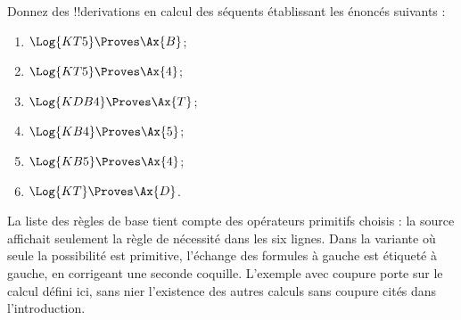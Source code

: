 \documentclass[../../../include/open-logic-section]{subfiles}
\begin{document}
\begin{prob}
Donnez des !!{derivation}s en calcul des séquents établissant les
énoncés suivants :
  \begin{enumerate}
  \item $\Log{KT5} \Proves \Ax{B}$;
  \item $\Log{KT5} \Proves \Ax{4}$;
  \item $\Log{KDB4} \Proves \Ax{T}$;
  \item $\Log{KB4} \Proves \Ax{5}$;
  \item $\Log{KB5} \Proves \Ax{4}$;
  \item $\Log{KT} \Proves \Ax{D}$.
  \end{enumerate}
\end{prob}
\begin{editorial}La liste des règles de base tient compte des opérateurs primitifs choisis : la source affichait seulement la règle de nécessité dans les six lignes. Dans la variante où seule la possibilité est primitive, l’échange des formules à gauche est étiqueté à gauche, en corrigeant une seconde coquille. L’exemple avec coupure porte sur le calcul défini ici, sans nier l’existence des autres calculs sans coupure cités dans l’introduction.\end{editorial}
\end{document}
